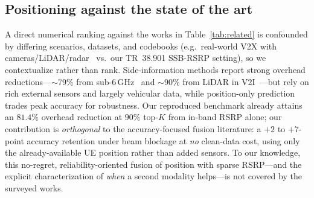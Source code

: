 \documentclass[conference]{IEEEtran}
\begin{document}
\subsection{Positioning against the state of the art}
A direct numerical ranking against the works in Table~\ref{tab:related} is
confounded by differing scenarios, datasets, and codebooks (e.g.\ real-world V2X
with cameras/LiDAR/radar~\cite{alkhateeb2023deepsense,jiang2023lidar,demirhan2022radar}
vs.\ our TR~38.901 SSB-RSRP setting), so we contextualize rather than rank.
Side-information methods report strong overhead reductions---$\sim$79\% from
sub-6\,GHz~\cite{sim2020sub6} and $\sim$90\% from LiDAR in V2I~\cite{jiang2023lidar}---but
rely on rich external sensors and largely vehicular data, while position-only
prediction~\cite{rezaie2022location,biliaminu2024v2i} trades peak accuracy for
robustness. Our reproduced benchmark already attains an $81.4\%$ overhead
reduction at $90\%$ top-$K$ from in-band RSRP alone; our contribution is
\emph{orthogonal} to the accuracy-focused fusion literature: a $+2$ to $+7$-point
accuracy retention under beam blockage at \emph{no} clean-data cost, using only
the already-available UE position rather than added sensors. To our knowledge,
this no-regret, reliability-oriented fusion of position with sparse RSRP---and the
explicit characterization of \emph{when} a second modality helps---is not covered
by the surveyed works.
\end{document}
